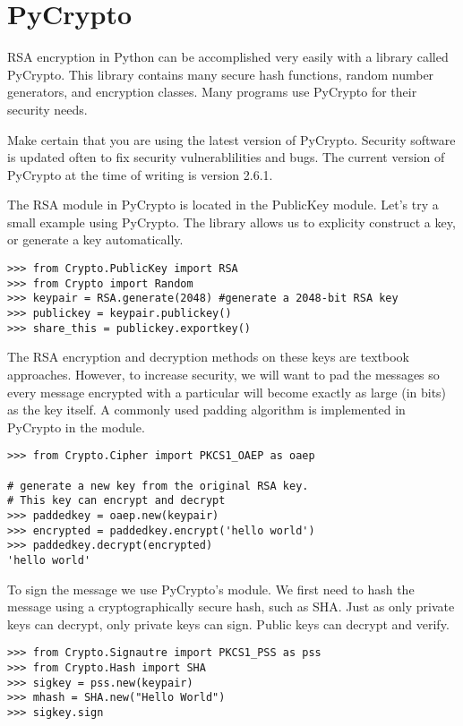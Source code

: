 \section{PyCrypto}
RSA encryption in Python can be accomplished very easily with a library called PyCrypto.
This library contains many secure hash functions, random number generators, and encryption classes.
Many programs use PyCrypto for their security needs.
\begin{warn}
Make certain that you are using the latest version of PyCrypto.
Security software is updated often to fix security vulnerablilities and bugs.
The current version of PyCrypto at the time of writing is version 2.6.1.
\end{warn}

The RSA module in PyCrypto is located in the PublicKey module.
Let's try a small example using PyCrypto.
The library allows us to explicity construct a key, or generate a key automatically.
\begin{lstlisting}
>>> from Crypto.PublicKey import RSA
>>> from Crypto import Random
>>> keypair = RSA.generate(2048) #generate a 2048-bit RSA key
>>> publickey = keypair.publickey()
>>> share_this = publickey.exportkey()
\end{lstlisting}

The RSA encryption and decryption methods on these keys are textbook approaches.
However, to increase security, we will want to pad the messages so every message encrypted with a particular will become exactly as large (in bits) as the key itself.
A commonly used padding algorithm is implemented in PyCrypto in the  module.
\begin{lstlisting}
>>> from Crypto.Cipher import PKCS1_OAEP as oaep

# generate a new key from the original RSA key.
# This key can encrypt and decrypt
>>> paddedkey = oaep.new(keypair)
>>> encrypted = paddedkey.encrypt('hello world')
>>> paddedkey.decrypt(encrypted)
'hello world'
\end{lstlisting}

To sign the message we use PyCrypto's  module.
We first need to hash the message using a cryptographically secure hash, such as SHA.
Just as only private keys can decrypt, only private keys can sign.
Public keys can decrypt and verify.
\begin{lstlisting}
>>> from Crypto.Signautre import PKCS1_PSS as pss
>>> from Crypto.Hash import SHA
>>> sigkey = pss.new(keypair)
>>> mhash = SHA.new("Hello World")
>>> sigkey.sign
\end{lstlisting}


